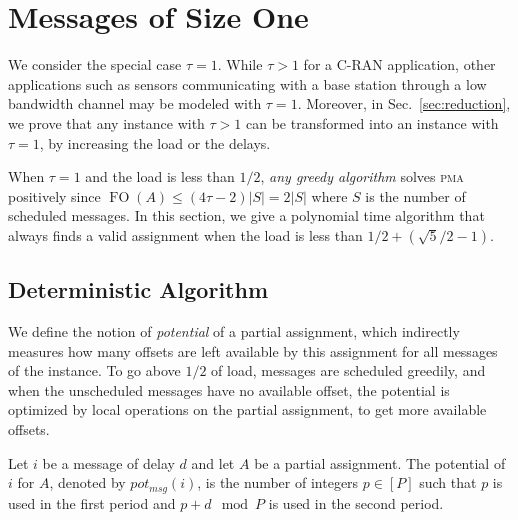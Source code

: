 \documentclass[a4paper,UKenglish,cleveref, autoref, thm-restate]{lipics-v2019}
\DeclareMathOperator{\Fo}{FO}
\newcommand\pma{\textsc{pma}\xspace}
\begin{document}
\section{Messages of Size One} \label{sec:small}

We consider the special case $\tau = 1$. While $\tau > 1$ for a C-RAN application, other
applications such as sensors communicating with a base station through a low bandwidth channel may be modeled with $\tau = 1$. Moreover, in Sec.~\ref{sec:reduction}, we prove that any instance with $\tau >1$ can be transformed into an instance with $\tau = 1$,
by increasing the load or the delays.

When $\tau = 1$ and the load is less than $1/2$, \emph{any greedy algorithm} solves \pma positively since $\Fo(A) \leq (4\tau -2)|S| = 2|S|$ where $S$ is the number of scheduled messages. In this section, we give a polynomial time algorithm that always finds a valid assignment when the load is less than $1/2 + (\sqrt{5}/2 -1)$.

\subsection{Deterministic Algorithm}

We define the notion of \emph{potential} of a partial assignment, which indirectly measures how many offsets are left available by this assignment for all messages of the instance. To go above $1/2$ of load, messages are scheduled greedily, and when the unscheduled messages have no available offset, the potential is optimized by local operations on the partial assignment, to get more available offsets. 
 
\begin{definition}
Let $i$ be a message of delay $d$ and let $A$ be a partial assignment.
The potential of $i$ for $A$, denoted by $pot_{msg}(i)$, is the number of integers $p \in [P]$ such that $p$ is used in the first period and $p+d \mod P$ is used in the second period. 
\end{definition}
\end{document}

